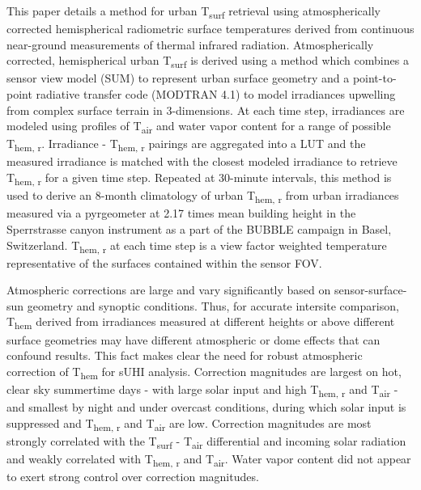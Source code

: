 This paper details a method for urban T\textsubscript{surf} retrieval using atmospherically corrected hemispherical radiometric surface temperatures derived from continuous near-ground measurements of thermal infrared radiation. Atmospherically corrected, hemispherical urban T\textsubscript{surf} is derived using a method which combines a sensor view model (SUM) to represent urban surface geometry and a point-to-point radiative transfer code (MODTRAN 4.1) to model irradiances upwelling from complex surface terrain in 3-dimensions. At each time step, irradiances are modeled using profiles of T\textsubscript{air} and water vapor content for a range of possible T\textsubscript{hem, r}. Irradiance - T\textsubscript{hem, r} pairings are aggregated into a LUT and the measured irradiance is matched with the closest modeled irradiance to retrieve T\textsubscript{hem, r} for a given time step. Repeated at 30-minute intervals, this method is used to derive an 8-month climatology of urban T\textsubscript{hem, r} from urban irradiances measured via a pyrgeometer at 2.17 times mean building height in the Sperrstrasse canyon instrument as a part of the BUBBLE campaign in Basel, Switzerland. T\textsubscript{hem, r} at each time step is a view factor weighted temperature representative of the surfaces contained within the sensor FOV.
 
Atmospheric corrections are large and vary significantly based on sensor-surface-sun geometry and synoptic conditions. Thus, for accurate intersite comparison, T\textsubscript{hem} derived from irradiances measured at different heights or above different surface geometries may have different atmospheric or dome effects that can confound results. This fact makes clear the need for robust atmospheric correction of T\textsubscript{hem} for sUHI analysis. Correction magnitudes are largest on hot, clear sky summertime days - with large solar input and high T\textsubscript{hem, r} and T\textsubscript{air} - and smallest by night and under overcast conditions, during which solar input is suppressed and T\textsubscript{hem, r} and T\textsubscript{air} are low. Correction magnitudes are most strongly correlated with the T\textsubscript{surf} - T\textsubscript{air} differential and incoming solar radiation and weakly correlated with T\textsubscript{hem, r} and T\textsubscript{air}. Water vapor content did not appear to exert strong control over correction magnitudes.

